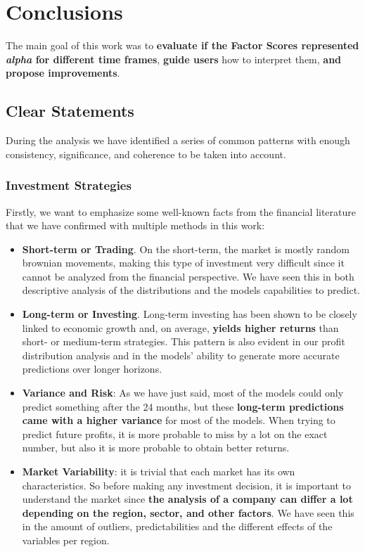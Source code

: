 \documentclass[11pt,english,a4paper,hidelinks]{book}
\begin{document}
\section{Conclusions}

The main goal of this work was to \textbf{evaluate if the Factor Scores represented \textit{alpha} for different time frames}, \textbf{guide users} how to interpret them, \textbf{and propose improvements}.

\subsection{Clear Statements}

\noindent During the analysis we have identified a series of common patterns with enough consistency, significance, and coherence to be taken into account.

\subsubsection{Investment Strategies}

\noindent Firstly, we want to emphasize some well-known facts from the financial literature that we have confirmed with multiple methods in this work:
\begin{itemize}
    \item \textbf{Short-term or Trading}. On the short-term, the market is mostly random brownian movements, making this type of investment very difficult since it cannot be analyzed from the financial perspective. We have seen this in both descriptive analysis of the distributions and the models capabilities to predict.
    \item \textbf{Long-term or Investing}. Long-term investing has been shown to be closely linked to economic growth and, on average, \textbf{yields higher returns} than short- or medium-term strategies. This pattern is also evident in our profit distribution analysis and in the models’ ability to generate more accurate predictions over longer horizons.
    \item \textbf{Variance and Risk}: As we have just said, most of the models could only predict something after the 24 months, but these \textbf{long-term predictions came with a higher variance} for most of the models. When trying to predict future profits, it is more probable to miss by a lot on the exact number, but also it is more probable to obtain better returns.
    \item \textbf{Market Variability}: it is trivial that each market has its own characteristics. So before making any investment decision, it is important to understand the market since \textbf{the analysis of a company can differ a lot depending on the region, sector, and other factors}. We have seen this in the amount of outliers, predictabilities and the different effects of the variables per region.
\end{itemize}
\end{document}
